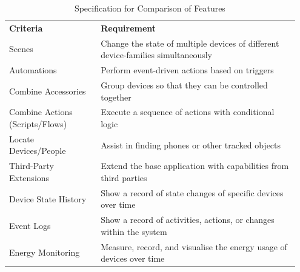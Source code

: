 \begin{table}[H]
    \centering
    \caption{Specification for Comparison of Features}
    \label{tab:spec_features}
    \begin{tabular}{ >{\raggedright} p{0.3\linewidth} p{0.65\linewidth} }
        \toprule
        \multicolumn{2}{ l }{\textbf{Features}} \\
        \midrule
        \textbf{Criteria} & \textbf{Requirement} \\
        \midrule
        Scenes & Change the state of multiple devices of different device-families simultaneously \\ \addlinespace
        Automations & Perform event-driven actions based on triggers \\ \addlinespace
        Combine Accessories & Group devices so that they can be controlled together \\ \addlinespace
        Combine Actions (Scripts/Flows) & Execute a sequence of actions with conditional logic \\ \addlinespace
        Locate Devices/People & Assist in finding phones or other tracked objects \\ \addlinespace
        Third-Party Extensions & Extend the base application with capabilities from third parties \\ \addlinespace
        Device State History & Show a record of state changes of specific devices over time \\ \addlinespace
        Event Logs & Show a record of activities, actions, or changes within the system \\ \addlinespace
        Energy Monitoring & Measure, record, and visualise the energy usage of devices over time \\
        \bottomrule
    \end{tabular}
\end{table}

